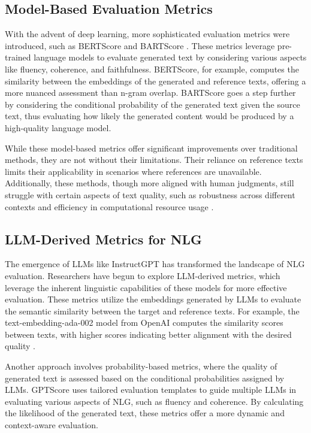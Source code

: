 \subsection{Model-Based Evaluation Metrics}

With the advent of deep learning, more sophisticated evaluation metrics were introduced, such as BERTScore and BARTScore \cite{zhang2019bertscore, yuan2021bartscore}. These metrics leverage pre-trained language models to evaluate generated text by considering various aspects like fluency, coherence, and faithfulness. BERTScore, for example, computes the similarity between the embeddings of the generated and reference texts, offering a more nuanced assessment than n-gram overlap. BARTScore goes a step further by considering the conditional probability of the generated text given the source text, thus evaluating how likely the generated content would be produced by a high-quality language model.

While these model-based metrics offer significant improvements over traditional methods, they are not without their limitations. Their reliance on reference texts limits their applicability in scenarios where references are unavailable. Additionally, these methods, though more aligned with human judgments, still struggle with certain aspects of text quality, such as robustness across different contexts and efficiency in computational resource usage \cite{he2022blind}.

\subsection{LLM-Derived Metrics for NLG}

The emergence of LLMs like InstructGPT \cite{ouyang2022training} has transformed the landscape of NLG evaluation. Researchers have begun to explore LLM-derived metrics, which leverage the inherent linguistic capabilities of these models for more effective evaluation. These metrics utilize the embeddings generated by LLMs to evaluate the semantic similarity between the target and reference texts. For example, the text-embedding-ada-002 model from OpenAI computes the similarity scores between texts, with higher scores indicating better alignment with the desired quality \cite{es2023ragas}.

Another approach involves probability-based metrics, where the quality of generated text is assessed based on the conditional probabilities assigned by LLMs. GPTScore \cite{fu2023gptscore} uses tailored evaluation templates to guide multiple LLMs in evaluating various aspects of NLG, such as fluency and coherence. By calculating the likelihood of the generated text, these metrics offer a more dynamic and context-aware evaluation.

